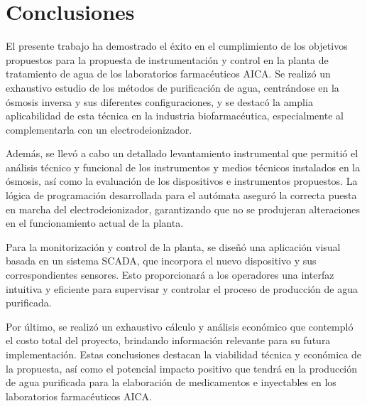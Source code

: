 \chapter*{Conclusiones}
{}
\vspace{-2cm} 
El presente trabajo ha demostrado el éxito en el cumplimiento de los objetivos propuestos para la propuesta de instrumentación y control en la planta de tratamiento de agua de los laboratorios farmacéuticos AICA. Se realizó un exhaustivo estudio de los métodos de purificación de agua, centrándose en la ósmosis inversa y sus diferentes configuraciones, y se destacó la amplia aplicabilidad de esta técnica en la industria biofarmacéutica, especialmente al complementarla con un electrodeionizador.

Además, se llevó a cabo un detallado levantamiento instrumental que permitió el análisis técnico y funcional de los instrumentos y medios técnicos instalados en la ósmosis, así como la evaluación de los dispositivos e instrumentos propuestos. La lógica de programación desarrollada para el autómata aseguró la correcta puesta en marcha del electrodeionizador, garantizando que no se produjeran alteraciones en el funcionamiento actual de la planta.

Para la monitorización y control de la planta, se diseñó una aplicación visual basada en un sistema SCADA, que incorpora el nuevo dispositivo y sus correspondientes sensores. Esto proporcionará a los operadores una interfaz intuitiva y eficiente para supervisar y controlar el proceso de producción de agua purificada.

Por último, se realizó un exhaustivo cálculo y análisis económico que contempló el costo total del proyecto, brindando información relevante para su futura implementación. Estas conclusiones destacan la viabilidad técnica y económica de la propuesta, así como el potencial impacto positivo que tendrá en la producción de agua purificada para la elaboración de medicamentos e inyectables en los laboratorios farmacéuticos AICA.




